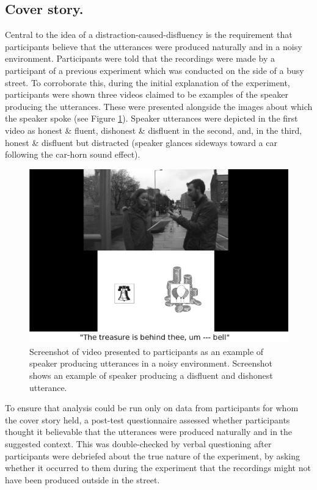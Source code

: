 \documentclass[a4paper,man,natbib]{apa6}
\begin{document}
\subsection{Cover story.}
Central to the idea of a distraction-caused-disfluency is the requirement that participants believe that the utterances were produced naturally and in a noisy environment. 
Participants were told that the recordings were made by a participant of a previous experiment which was conducted on the side of a busy street. 
To corroborate this, during the initial explanation of the experiment, participants were shown three videos claimed to be examples of the speaker producing the utterances. 
These were presented alongside the images about which the speaker spoke (see Figure \ref{fig:vid}). 
Speaker utterances were depicted in the first video as honest \& fluent, dishonest \& disfluent in the second, and, in the third, honest \& disfluent but distracted (speaker glances sideways toward a car following the car-horn sound effect).\\

\begin{figure}[Ht]
  \centering
	\includegraphics[scale=.2]{convincer.png}
  \caption{Screenshot of video presented to participants as an example of speaker producing utterances in a noisy environment. Screenshot shows an example of speaker producing a disfluent and dishonest utterance.}
  \label{fig:vid}
\end{figure}



To ensure that analysis could be run only on data from participants for whom the cover story held, a post-test questionnaire assessed whether participants thought it believable that the utterances were produced naturally and in the suggested context. 
This was double-checked by verbal questioning after participants were debriefed about the true nature of the experiment, by asking whether it occurred to them during the experiment that the recordings might not have been produced outside in the street.\\
\end{document}
